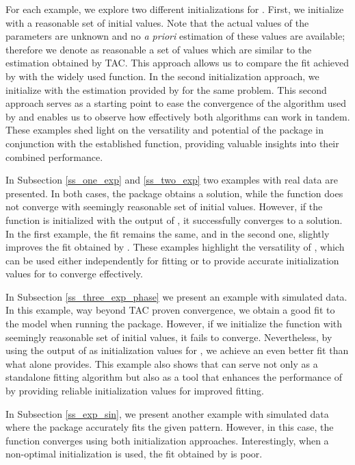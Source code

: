 For each example, we explore two different initializations for . First, we initialize  with a reasonable set of initial values. Note that the actual values of the parameters are unknown and no \textit{a priori} estimation of these values are available; therefore we denote as reasonable a set of values which are similar to the estimation obtained by TAC. This approach allows us to compare the fit achieved by  with the widely used  function. In the second initialization approach, we initialize  with the estimation provided by  for the same problem. This second approach serves as a starting point to ease the convergence of the algorithm used by  and enables us to observe how effectively both algorithms can work in tandem. These examples shed light on the versatility and potential of the  package in conjunction with the established  function, providing valuable insights into their combined performance.

In Subsection \ref{ss_one_exp} and \ref{ss_two_exp} two examples with real data are presented. In both cases, the  package obtains a solution, while the  function does not converge with seemingly reasonable set of initial values. However, if the  function is initialized with the output of , it successfully converges to a solution. In the first example, the fit remains the same, and in the second one,  slightly improves the fit obtained by . These examples highlight the versatility of , which can be used either independently for fitting or to provide accurate initialization values for  to converge effectively.

In Subsection \ref{ss_three_exp_phase} we present an example with simulated data. In this example, way beyond TAC proven convergence, we obtain a good fit to the model when running the  package. However, if we initialize the  function with seemingly reasonable set of initial values, it fails to converge. Nevertheless, by using the output of  as initialization values for , we achieve an even better fit than what  alone provides. This example also shows that  can serve not only as a standalone fitting algorithm but also as a tool that enhances the performance of  by providing reliable initialization values for improved fitting.

In Subsection \ref{ss_exp_sin}, we present another example with simulated data where the  package accurately fits the given pattern. However, in this case, the  function converges using both initialization approaches. Interestingly, when a non-optimal initialization is used, the fit obtained by  is poor.


